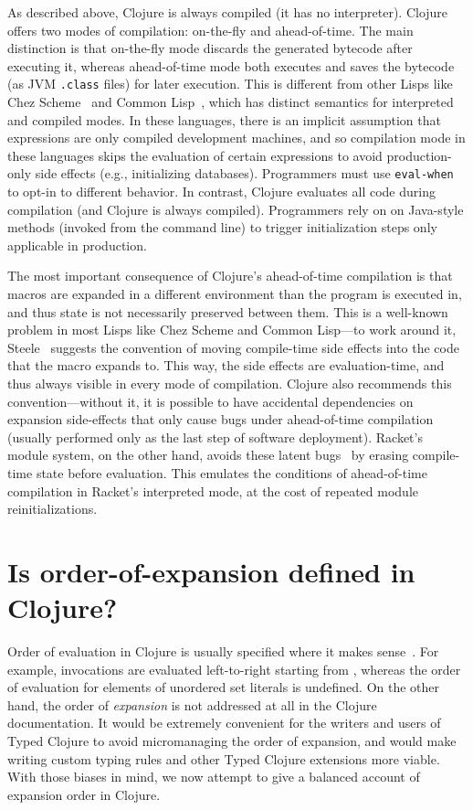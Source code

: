 As described above, Clojure is always compiled (it has no interpreter).
Clojure offers two modes of compilation: on-the-fly and ahead-of-time.
The main distinction is that
on-the-fly mode discards the generated bytecode after executing it, whereas ahead-of-time mode
both executes and saves the bytecode (as JVM \texttt{.class} files) for later execution.
This is different from other Lisps like Chez Scheme~\cite{dybvig2018chez} and
Common Lisp~\cite{steele1990common},
which has distinct semantics for 
interpreted and compiled modes.
In these languages, there is an implicit assumption that expressions are only
compiled development machines,
and so
compilation mode in these languages skips
the evaluation of certain expressions
to avoid production-only side effects (e.g., initializing databases). Programmers must
use \texttt{eval-when} to opt-in to different behavior.
In contrast, Clojure evaluates all code during compilation (and Clojure is always compiled). Programmers
rely on
on Java-style  methods (invoked from the command line) to trigger initialization steps only
applicable in production.

The most important consequence of Clojure's ahead-of-time compilation is that
macros are expanded in a different environment than the program is executed in, and
thus state is not necessarily preserved between them.
This is a well-known problem in most Lisps like Chez Scheme and Common Lisp---to work around it,
Steele~\cite{steele1990common} suggests the convention of moving compile-time
side effects into the code that the macro expands to.
This way, the side effects are evaluation-time, and thus always visible in
every mode of compilation.
Clojure also recommends this convention---without it,
it is possible to have accidental dependencies on expansion
side-effects that only cause bugs under ahead-of-time compilation (usually performed 
only as the last step of software deployment).
Racket's module system, on the other hand, avoids these latent bugs~\cite{flatt2002composable}
by erasing compile-time state before evaluation.
This emulates the conditions of ahead-of-time compilation in Racket's interpreted mode,
at the cost of repeated module reinitializations.

\section{Is order-of-expansion defined in Clojure?}

Order of evaluation in Clojure is usually specified where it makes sense~\cite{CljEvalDoc}.
For example, invocations  are evaluated left-to-right
starting from , whereas the order of evaluation for elements of unordered set literals 
is undefined.
On the other hand, the order of \emph{expansion} is not addressed at all in the Clojure
documentation.
It would be extremely convenient for the writers and users of Typed Clojure
to avoid micromanaging the order of expansion, and would
make writing custom typing rules and other Typed Clojure
extensions more viable.
With those biases in mind, we now attempt to give a balanced account
of expansion order in Clojure.

